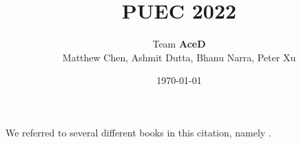 \documentclass{article}
\title{PUEC 2022}
\author{Team \textbf{AceD}\\
Matthew Chen, Ashmit Dutta, Bhanu Narra, Peter Xu}
\date{\today}
\begin{document}
\maketitle

\tableofcontents
\newpage 
We referred to several different books in this citation, namely \cite{Ryder1996Quantum}\cite{sakurai2006advanced}\cite{schwartz2014quantum}\cite{zee2010quantum}.











\end{document}
